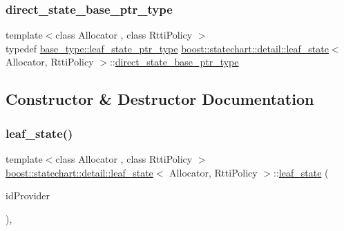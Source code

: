 \subsubsection{\texorpdfstring{direct\+\_\+state\+\_\+base\+\_\+ptr\+\_\+type}{direct\_state\_base\_ptr\_type}}
{\footnotesize\ttfamily template$<$class Allocator , class Rtti\+Policy $>$ \\
typedef \mbox{\hyperlink{classboost_1_1statechart_1_1detail_1_1state__base_a80b7d62ba0bb8e4fbef3e2e76e2a6021}{base\+\_\+type\+::leaf\+\_\+state\+\_\+ptr\+\_\+type}} \mbox{\hyperlink{classboost_1_1statechart_1_1detail_1_1leaf__state}{boost\+::statechart\+::detail\+::leaf\+\_\+state}}$<$ Allocator, Rtti\+Policy $>$\+::\mbox{\hyperlink{classboost_1_1statechart_1_1detail_1_1leaf__state_a50634727a16fd74c39340410b1e8217d}{direct\+\_\+state\+\_\+base\+\_\+ptr\+\_\+type}}}



\subsection{Constructor \& Destructor Documentation}
\mbox{\label{classboost_1_1statechart_1_1detail_1_1leaf__state_aa95950d20e977b784863b3ec80d01625}} 
\subsubsection{\texorpdfstring{leaf\+\_\+state()}{leaf\_state()}}
{\footnotesize\ttfamily template$<$class Allocator , class Rtti\+Policy $>$ \\
\mbox{\hyperlink{classboost_1_1statechart_1_1detail_1_1leaf__state}{boost\+::statechart\+::detail\+::leaf\+\_\+state}}$<$ Allocator, Rtti\+Policy $>$\+::\mbox{\hyperlink{classboost_1_1statechart_1_1detail_1_1leaf__state}{leaf\+\_\+state}} (\begin{DoxyParamCaption}\item[{typename Rtti\+Policy\+::id\+\_\+provider\+\_\+type}]{id\+Provider }\end{DoxyParamCaption})\hspace{0.3cm}{\ttfamily [inline]}, {\ttfamily [protected]}}


